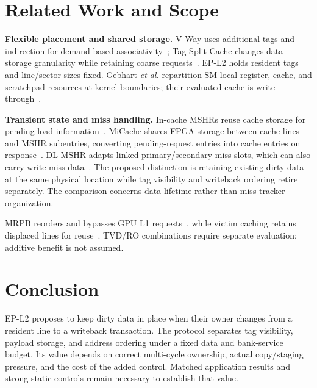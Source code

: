 \documentclass[conference,letterpaper]{IEEEtran}
\newcommand{\epl}{EP-L2}
\begin{document}
\section{Related Work and Scope}
\textbf{Flexible placement and shared storage.} V-Way uses additional tags and indirection for demand-based associativity~\cite{vway}; Tag-Split Cache changes data-storage granularity while retaining coarse requests~\cite{tsc}. \epl{} holds resident tags and line/sector sizes fixed. Gebhart \emph{et al.} repartition SM-local register, cache, and scratchpad resources at kernel boundaries; their evaluated cache is write-through~\cite{unified}. 

\textbf{Transient state and miss handling.} In-cache MSHRs reuse cache storage for pending-load information~\cite{farkas}. MiCache shares FPGA storage between cache lines and MSHR subentries, converting pending-request entries into cache entries on response~\cite{micache}. DL-MSHR adapts linked primary/secondary-miss slots, which can also carry write-miss data~\cite{dlmshr}. The proposed distinction is retaining existing dirty data at the same physical location while tag visibility and writeback ordering retire separately. The comparison concerns data lifetime rather than miss-tracker organization.

MRPB reorders and bypasses GPU L1 requests~\cite{mrpb}, while victim caching retains displaced lines for reuse~\cite{victim}. TVD/RO combinations require separate evaluation; additive benefit is not assumed.

\section{Conclusion}
\epl{} proposes to keep dirty data in place when their owner changes from a resident line to a writeback transaction. The protocol separates tag visibility, payload storage, and address ordering under a fixed data and bank-service budget. Its value depends on correct multi-cycle ownership, actual copy/staging pressure, and the cost of the added control. Matched application results and strong static controls remain necessary to establish that value.
\end{document}
